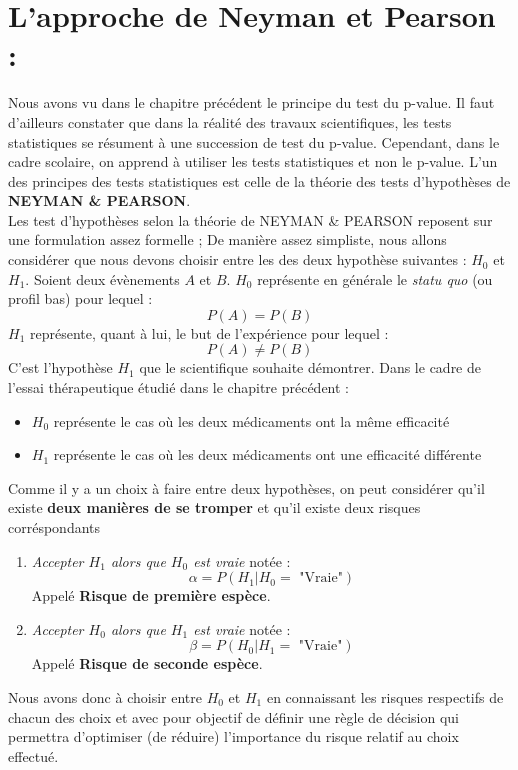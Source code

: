 \section{L'approche de Neyman et Pearson :}
Nous avons vu dans le chapitre précédent le principe du test du p-value. Il faut d'ailleurs constater que dans la réalité des travaux scientifiques, les tests statistiques se résument à une succession de test du p-value.\newline
Cependant, dans le cadre scolaire, on apprend à utiliser les tests statistiques et non le p-value. L'un des principes des tests statistiques est celle de la théorie des tests d'hypothèses de \textbf{NEYMAN \& PEARSON}.\newline
\\
Les test d'hypothèses selon la théorie de NEYMAN \& PEARSON reposent sur une formulation assez formelle ; De manière assez simpliste, nous allons considérer que nous devons choisir entre les des deux hypothèse suivantes : $H_{0}$ et $H_{1}$.\newline
Soient deux évènements $A$ et $B$.\newline
$H_{0}$ représente en générale le \textit{statu quo} (ou profil bas) pour lequel :
$$P(A)=P(B)$$
$H_{1}$ représente, quant à lui, le but de l'expérience pour lequel :
$$P(A)\neq P(B)$$
C'est l'hypothèse $H_{1}$ que le scientifique souhaite démontrer.\newline 
Dans le cadre de l'essai thérapeutique étudié dans le chapitre précédent : 
\begin{itemize}
\item $H_{0}$ représente le cas où les deux médicaments ont la même efficacité 
\item $H_{1}$ représente le cas où les deux médicaments ont une efficacité différente
\end{itemize}
Comme il y a un choix à faire entre deux hypothèses, on peut considérer qu'il existe \textbf{deux manières de se tromper} et qu'il existe deux risques corréspondants 
\begin{enumerate}
\item \textit{Accepter $H_{1}$ alors que $H_{0}$ est vraie} notée : 
$$\alpha = P(H_{1}|H_{0}=\textrm{ "Vraie"})$$
Appelé \textbf{Risque de première espèce}.
\item \textit{Accepter $H_{0}$ alors que $H_{1}$ est vraie} notée : 
$$\beta = P(H_{0}|H_{1}=\textrm{ "Vraie"})$$
Appelé \textbf{Risque de seconde espèce}.
\end{enumerate}
Nous avons donc à choisir entre $H_{0}$ et $H_{1}$ en connaissant les risques respectifs de chacun des choix et avec pour objectif de définir une règle de décision qui permettra d'optimiser (de réduire) l'importance du risque relatif au choix effectué.\newline
